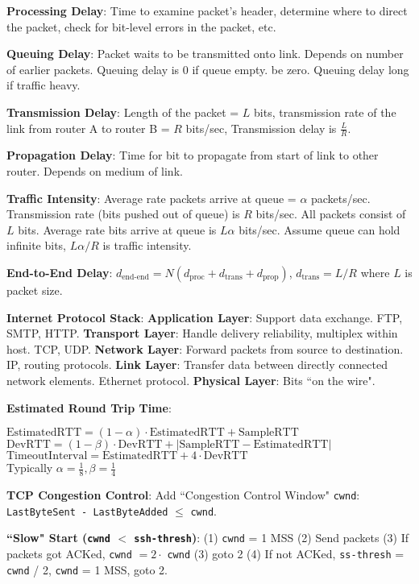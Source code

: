 \documentclass{scrartcl}
\begin{document}
\raggedright
\begin{multicols*}{3}


{\bf Processing Delay}: Time to examine packet's header, determine where to direct the packet, check for bit-level errors in the packet, etc.

{\bf Queuing Delay}: Packet waits to be transmitted onto link. Depends on number of earlier packets. Queuing delay is 0 if queue empty. be zero. Queuing delay long if traffic heavy.

{\bf Transmission Delay}: Length of the packet = $L$ bits, transmission rate of the link from router A to router B = $R$ bits/sec, Transmission delay is $\frac{L}{R}$.

{\bf Propagation Delay}: Time for bit to propagate from start of link to other router. Depends on medium of link.

{\bf Traffic Intensity}: Average rate packets arrive at queue = $\alpha$ packets/sec. Transmission rate (bits pushed out of queue) is $R$ bits/sec. All packets consist of $L$ bits. Average rate bits arrive at queue is $L\alpha$ bits/sec. Assume queue can hold infinite bits, $L\alpha / R$ is traffic intensity.

{\bf End-to-End Delay}: $d_{\text{end-end}} = N(d_{\text{proc}}+d_{\text{trans}}+d_{\text{prop}})$, $d_{\text{trans}}=L/R$ where $L$ is packet size.

{\bf Internet Protocol Stack}: {\bf Application Layer}: Support data exchange. FTP, SMTP, HTTP. {\bf Transport Layer}: Handle delivery reliability, multiplex within host. TCP, UDP. {\bf Network Layer}: Forward packets from source to destination. IP, routing protocols. {\bf Link Layer}: Transfer data between directly connected network elements. Ethernet protocol. {\bf Physical Layer}: Bits ``on the wire".


{\bf Estimated Round Trip Time}:

$\text{EstimatedRTT}=(1-\alpha)\cdot\text{EstimatedRTT}+\text{SampleRTT}$\\
$\text{DevRTT}=(1-\beta)\cdot\text{DevRTT}+|\text{SampleRTT}-\text{EstimatedRTT}|$\\
$\text{TimeoutInterval}=\text{EstimatedRTT}+4\cdot\text{DevRTT}$ \\
Typically $\alpha=\frac{1}{8}, \beta=\frac{1}{4}$


{\bf TCP Congestion Control}: Add ``Congestion Control Window" \texttt{cwnd}: \texttt{LastByteSent - LastByteAdded} $\leq$ \texttt{cwnd}.

{\bf ``Slow" Start (\texttt{cwnd} $<$ \texttt{ssh-thresh})}: (1) \texttt{cwnd} = 1 MSS (2) Send packets (3) If packets got ACKed, \texttt{cwnd} $=2\cdot$ \texttt{cwnd} (3) goto 2
(4) If not ACKed, \texttt{ss-thresh} = \texttt{cwnd} / 2, \texttt{cwnd} = 1 MSS, goto 2.


\end{multicols*}
\end{document}
